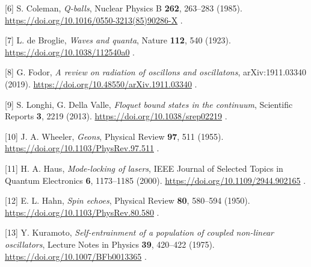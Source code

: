 \documentclass[
  a4paper,
]{ltjsarticle}
\begin{document}
{[}6{]} S. Coleman, \emph{Q-balls}, Nuclear Physics B \textbf{262},
263--283 (1985). \url{https://doi.org/10.1016/0550-3213(85)90286-X} .

{[}7{]} L. de Broglie, \emph{Waves and quanta}, Nature \textbf{112}, 540
(1923). \url{https://doi.org/10.1038/112540a0} .

{[}8{]} G. Fodor, \emph{A review on radiation of oscillons and
oscillatons}, arXiv:1911.03340 (2019).
\url{https://doi.org/10.48550/arXiv.1911.03340} .

{[}9{]} S. Longhi, G. Della Valle, \emph{Floquet bound states in the
continuum}, Scientific Reports \textbf{3}, 2219 (2013).
\url{https://doi.org/10.1038/srep02219} .

{[}10{]} J. A. Wheeler, \emph{Geons}, Physical Review \textbf{97}, 511
(1955). \url{https://doi.org/10.1103/PhysRev.97.511} .

{[}11{]} H. A. Haus, \emph{Mode-locking of lasers}, IEEE Journal of
Selected Topics in Quantum Electronics \textbf{6}, 1173--1185 (2000).
\url{https://doi.org/10.1109/2944.902165} .

{[}12{]} E. L. Hahn, \emph{Spin echoes}, Physical Review \textbf{80},
580--594 (1950). \url{https://doi.org/10.1103/PhysRev.80.580} .

{[}13{]} Y. Kuramoto, \emph{Self-entrainment of a population of coupled
non-linear oscillators}, Lecture Notes in Physics \textbf{39}, 420--422
(1975). \url{https://doi.org/10.1007/BFb0013365} .
\end{document}
